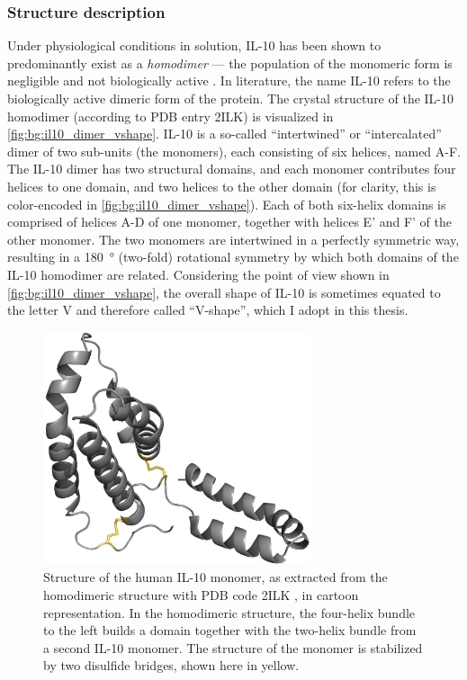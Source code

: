 \subsubsection{Structure description}

Under physiological conditions in solution, IL-10 has been shown to
predominantly exist as a \textit{homodimer} --- the population of the monomeric
form is negligible and not biologically active \cite{syto_il10_homodimer_1998}.
In literature, the name IL-10 refers to the biologically active dimeric form of
the protein. The crystal structure of the IL-10 homodimer (according to PDB
entry 2ILK) is visualized in \cref{fig:bg:il10_dimer_vshape}. IL-10 is a
so-called \enquote{intertwined} or \enquote{intercalated} dimer of two sub-units
(the monomers), each consisting of six helices, named A-F. The IL-10 dimer has
two structural domains, and each monomer contributes four helices to one domain,
and two helices to the other domain (for clarity, this is color-encoded in
\cref{fig:bg:il10_dimer_vshape}). Each of both six-helix domains is comprised of
helices A-D of one monomer, together with helices E' and F' of the other
monomer. The two monomers are intertwined in a perfectly symmetric way,
resulting in a \SI{180}{\degree} (two-fold) rotational symmetry by which both
domains of the IL-10 homodimer are related. Considering the point of view shown
in \cref{fig:bg:il10_dimer_vshape}, the overall shape of IL-10 is sometimes
equated to the letter V and therefore called \enquote{V-shape}, which I adopt in
this thesis.

\begin{figure}
\centering
\includegraphics[width=0.7\textwidth]{gfx/background/IL10_2ilk_disulfide_with.jpg}
\caption[]{
Structure of the human IL-10 monomer, as extracted from the homodimeric
structure with PDB code 2ILK \cite{Zdanov1996}, in cartoon representation. In
the homodimeric structure, the four-helix bundle to the left builds a domain
together with the two-helix bundle from a second IL-10 monomer. The structure of
the monomer is stabilized by two disulfide bridges, shown here in yellow. }
\label{fig:bg:il10_monomer_disulfide}
\end{figure}


